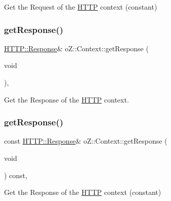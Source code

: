 Get the Request of the \mbox{\hyperlink{namespaceo_z_1_1_h_t_t_p}{H\+T\+TP}} context (constant) 

\mbox{\label{classo_z_1_1_context_ab656757ce56d11f39814747f1efe1f86}} 
\subsubsection{\texorpdfstring{getResponse()}{getResponse()}\hspace{0.1cm}{\footnotesize\ttfamily [1/2]}}
{\footnotesize\ttfamily \mbox{\hyperlink{classo_z_1_1_h_t_t_p_1_1_response}{H\+T\+T\+P\+::\+Response}}\& o\+Z\+::\+Context\+::get\+Response (\begin{DoxyParamCaption}\item[{void}]{ }\end{DoxyParamCaption})\hspace{0.3cm}{\ttfamily [inline]}, {\ttfamily [noexcept]}}



Get the Response of the \mbox{\hyperlink{namespaceo_z_1_1_h_t_t_p}{H\+T\+TP}} context. 

\mbox{\label{classo_z_1_1_context_aad384e516919b9c4faf5b702b85994af}} 
\subsubsection{\texorpdfstring{getResponse()}{getResponse()}\hspace{0.1cm}{\footnotesize\ttfamily [2/2]}}
{\footnotesize\ttfamily const \mbox{\hyperlink{classo_z_1_1_h_t_t_p_1_1_response}{H\+T\+T\+P\+::\+Response}}\& o\+Z\+::\+Context\+::get\+Response (\begin{DoxyParamCaption}\item[{void}]{ }\end{DoxyParamCaption}) const\hspace{0.3cm}{\ttfamily [inline]}, {\ttfamily [noexcept]}}



Get the Response of the \mbox{\hyperlink{namespaceo_z_1_1_h_t_t_p}{H\+T\+TP}} context (constant) 

\mbox{\label{classo_z_1_1_context_af912acc5fa475aa1e835a71df1752ef5}} 
